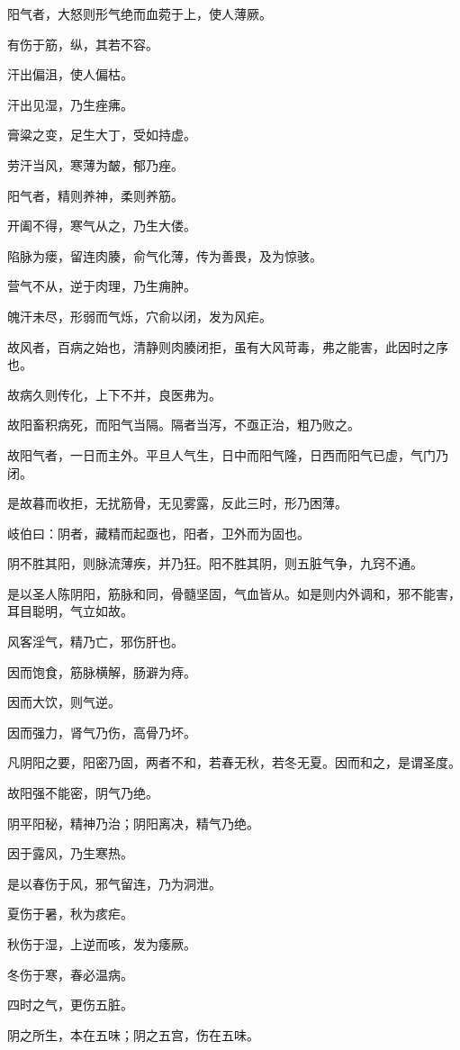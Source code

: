 \documentclass{article}%
\begin{document}
阳气者，大怒则形气绝而血菀于上，使人薄厥。

有伤于筋，纵，其若不容。

汗出偏沮，使人偏枯。

汗出见湿，乃生痤疿。

膏粱之变，足生大丁，受如持虚。

劳汗当风，寒薄为皶，郁乃痤。

阳气者，精则养神，柔则养筋。

开阖不得，寒气从之，乃生大偻。

陷脉为瘘，留连肉腠，俞气化薄，传为善畏，及为惊骇。

营气不从，逆于肉理，乃生痈肿。

魄汗未尽，形弱而气烁，穴俞以闭，发为风疟。

故风者，百病之始也，清静则肉腠闭拒，虽有大风苛毒，弗之能害，此因时之序也。

故病久则传化，上下不并，良医弗为。

故阳畜积病死，而阳气当隔。隔者当泻，不亟正治，粗乃败之。

故阳气者，一日而主外。平旦人气生，日中而阳气隆，日西而阳气已虚，气门乃闭。

是故暮而收拒，无扰筋骨，无见雾露，反此三时，形乃困薄。

岐伯曰：阴者，藏精而起亟也，阳者，卫外而为固也。

阴不胜其阳，则脉流薄疾，并乃狂。阳不胜其阴，则五脏气争，九窍不通。

是以圣人陈阴阳，筋脉和同，骨髓坚固，气血皆从。如是则内外调和，邪不能害，耳目聪明，气立如故。

风客淫气，精乃亡，邪伤肝也。

因而饱食，筋脉横解，肠澼为痔。

因而大饮，则气逆。

因而强力，肾气乃伤，高骨乃坏。

凡阴阳之要，阳密乃固，两者不和，若春无秋，若冬无夏。因而和之，是谓圣度。

故阳强不能密，阴气乃绝。

阴平阳秘，精神乃治；阴阳离决，精气乃绝。

因于露风，乃生寒热。

是以春伤于风，邪气留连，乃为洞泄。

夏伤于暑，秋为痎疟。

秋伤于湿，上逆而咳，发为痿厥。

冬伤于寒，春必温病。

四时之气，更伤五脏。

阴之所生，本在五味；阴之五宫，伤在五味。
\end{document}

